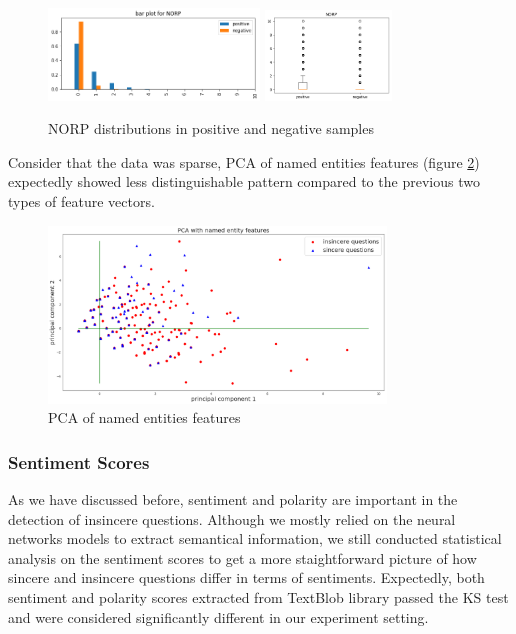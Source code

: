 \documentclass[12pt]{diazessay} %
\begin{document}
\begin{figure}[!htbp]
    \centering
    \includegraphics[width=0.5\textwidth]{graphs/bar_norp.png}
    \includegraphics[width=0.3\textwidth]{graphs/norp_box.png}
    \caption{NORP distributions in positive and negative samples}
    \label{figure:norp}
\end{figure}

Consider that the data was sparse, PCA of named entities features (figure \ref{figure:entpca}) expectedly showed less distinguishable pattern compared to the previous two types of feature vectors. 

\begin{figure}[!htbp]
    \includegraphics[width=0.8\textwidth, center]{graphs/pca/2Dent.png}
    \caption{PCA of named entities features} 
    \label{figure:entpca}
\end{figure}


\subsubsection{Sentiment Scores} %
\label{ssub:sentiment_scores}

As we have discussed before, sentiment and polarity are important in the detection of insincere questions. Although we mostly relied on the neural networks models to extract semantical information, we still conducted statistical analysis on the sentiment scores to get a more staightforward picture of how sincere and insincere questions differ in terms of sentiments. Expectedly, both sentiment and polarity scores extracted from TextBlob library passed the KS test and were considered significantly different in our experiment setting. 
\end{document}
